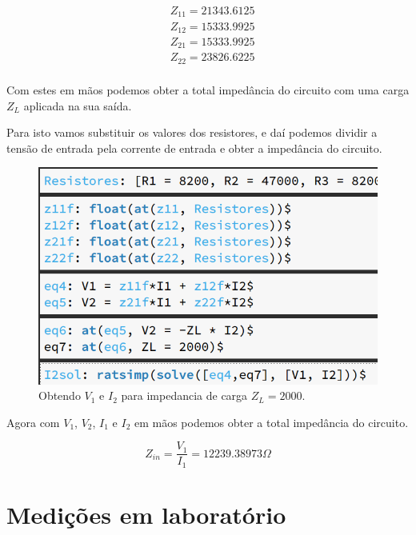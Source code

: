 \documentclass[12pt,twoside, a4paper, twocolumn]{article}
\begin{document}
\begin{equation}
    \begin{aligned}
         & Z_{11} = 21343.6125 \\
         & Z_{12} = 15333.9925 \\
         & Z_{21} = 15333.9925 \\
         & Z_{22} = 23826.6225 \\
    \end{aligned}
\end{equation}




Com estes em mãos podemos obter a total impedância do circuito com uma carga $Z_L$ aplicada na sua saída.


Para isto vamos substituir os valores dos resistores, e daí podemos dividir a tensão de entrada pela corrente de entrada e obter a impedância do circuito.




\begin{figure}[h]
    \centering
    \includegraphics[width=1\columnwidth]{images/ZL.png}
    \caption{Obtendo $V_1$ e $I_2$ para impedancia de carga $Z_L = 2000$.}
\end{figure}




Agora com $V_1$, $V_2$, $I_1$ e $I_2$ em mãos podemos obter a total impedância do circuito.


\begin{equation}
    Z_{in} = \frac{V_1}{I_1} = 12239.38973 \varOmega
\end{equation}




\section{Medições em laboratório}
\end{document}
